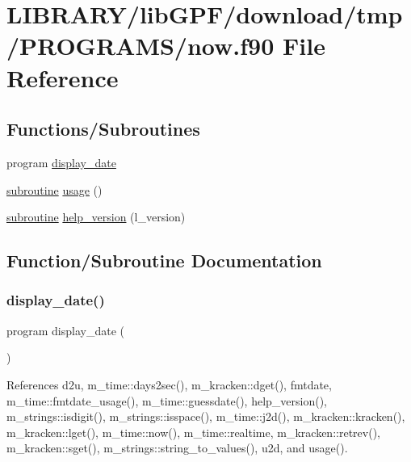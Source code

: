 \hypertarget{now_8f90}{}\section{L\+I\+B\+R\+A\+R\+Y/lib\+G\+P\+F/download/tmp/\+P\+R\+O\+G\+R\+A\+M\+S/now.f90 File Reference}
\label{now_8f90}
\subsection*{Functions/\+Subroutines}
\begin{DoxyCompactItemize}
\item 
program \hyperlink{now_8f90_a0a9caf8a3d791fca5628f441ed1b18ef}{display\+\_\+date}
\item 
\hyperlink{M__stopwatch_83_8txt_acfbcff50169d691ff02d4a123ed70482}{subroutine} \hyperlink{now_8f90_a2f52503ff8f83f2a588647231e597e58}{usage} ()
\item 
\hyperlink{M__stopwatch_83_8txt_acfbcff50169d691ff02d4a123ed70482}{subroutine} \hyperlink{now_8f90_a52114522a23078dbabe7b35ced8a9ae5}{help\+\_\+version} (l\+\_\+version)
\end{DoxyCompactItemize}


\subsection{Function/\+Subroutine Documentation}
\mbox{\label{now_8f90_a0a9caf8a3d791fca5628f441ed1b18ef}} 
\subsubsection{\texorpdfstring{display\+\_\+date()}{display\_date()}}
{\footnotesize\ttfamily program display\+\_\+date (\begin{DoxyParamCaption}{ }\end{DoxyParamCaption})}



References d2u, m\+\_\+time\+::days2sec(), m\+\_\+kracken\+::dget(), fmtdate, m\+\_\+time\+::fmtdate\+\_\+usage(), m\+\_\+time\+::guessdate(), help\+\_\+version(), m\+\_\+strings\+::isdigit(), m\+\_\+strings\+::isspace(), m\+\_\+time\+::j2d(), m\+\_\+kracken\+::kracken(), m\+\_\+kracken\+::lget(), m\+\_\+time\+::now(), m\+\_\+time\+::realtime, m\+\_\+kracken\+::retrev(), m\+\_\+kracken\+::sget(), m\+\_\+strings\+::string\+\_\+to\+\_\+values(), u2d, and usage().

